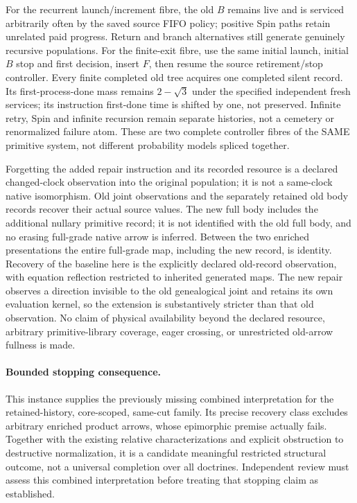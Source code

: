 \documentclass{article}
\begin{document}
For the recurrent launch/increment fibre, the old $B$ remains live and is serviced arbitrarily often by the saved source FIFO policy; positive Spin paths retain unrelated paid progress. Return and branch alternatives still generate genuinely recursive populations. For the finite-exit fibre, use the same initial launch, initial $B$ stop and first decision, insert $F$, then resume the source retirement/stop controller. Every finite completed old tree acquires one completed silent record. Its first-process-done mass remains $2-\sqrt3$ under the specified independent fresh services; its instruction first-done time is shifted by one, not preserved. Infinite retry, Spin and infinite recursion remain separate histories, not a cemetery or renormalized failure atom. These are two complete controller fibres of the SAME primitive system, not different probability models spliced together.

Forgetting the added repair instruction and its recorded resource is a declared changed-clock observation into the original population; it is not a same-clock native isomorphism. Old joint observations and the separately retained old body records recover their actual source values. The new full body includes the additional nullary primitive record; it is not identified with the old full body, and no erasing full-grade native arrow is inferred. Between the two enriched presentations the entire full-grade map, including the new record, is identity. Recovery of the baseline here is the explicitly declared old-record observation, with equation reflection restricted to inherited generated maps. The new repair observes a direction invisible to the old genealogical joint and retains its own evaluation kernel, so the extension is substantively stricter than that old observation. No claim of physical availability beyond the declared resource, arbitrary primitive-library coverage, eager crossing, or unrestricted old-arrow fullness is made.

\paragraph{Bounded stopping consequence.}
This instance supplies the previously missing combined interpretation for the retained-history, core-scoped, same-cut family. Its precise recovery class excludes arbitrary enriched product arrows, whose epimorphic premise actually fails. Together with the existing relative characterizations and explicit obstruction to destructive normalization, it is a candidate meaningful restricted structural outcome, not a universal completion over all doctrines. Independent review must assess this combined interpretation before treating that stopping claim as established.
\end{document}
